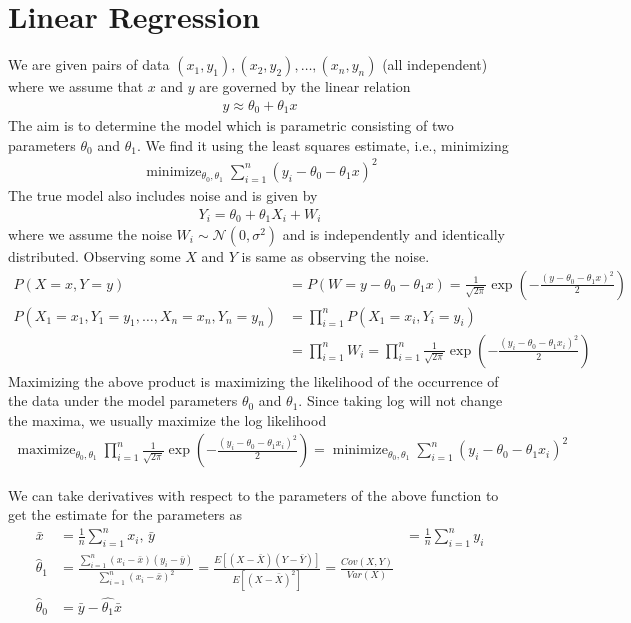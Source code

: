 \documentclass[11pt, a4paper]{article}
\DeclareMathOperator*{\minimize}{minimize}
\DeclareMathOperator*{\maximize}{maximize}
\begin{document}
    \section{Linear Regression}
    We are given pairs of data $(x_{1},y_{1}), (x_{2},y_{2}), \ldots, (x_{n},y_{n})$ (all independent) where we assume that $x$ and $y$ are governed by the linear relation
    \begin{align*}
        y \approx \theta_{0} + \theta_{1}x
    \end{align*}
    The aim is to determine the model which is parametric consisting of two parameters $\theta_{0}$ and $\theta_{1}$. We find it using the least squares estimate, i.e., minimizing
    \begin{align*}
        \minimize_{\theta_{0}, \theta_{1}} \sum_{i=1}^{n} (y_{i} - \theta_{0} - \theta_{1}x)^{2}
    \end{align*}
    The true model also includes noise and is given by
    \begin{align*}
        Y_{i} = \theta_{0} + \theta_{1}X_{i} + W_{i}
    \end{align*}
    where we assume the noise $W_{i} \sim \mathcal{N}(0, \sigma^{2})$ and is independently and identically distributed. Observing some $X$ and $Y$ is same as observing the noise.
    \begin{align*}
        P(X=x,Y=y) &= P(W=y-\theta_{0}-\theta_{1}x) = \frac{1}{\sqrt{2\pi}} \exp(-\frac{(y-\theta_{0}-\theta_{1}x)^{2}}{2})\\
        P(X_{1}=x_{1},Y_{1}=y_{1}, \ldots, X_{n}=x_{n},Y_{n}=y_{n}) &= \prod_{i=1}^{n} P(X_{1}=x_{i},Y_{i}=y_{i})\\
        &= \prod_{i=1}^{n} W_{i} = \prod_{i=1}^{n} \frac{1}{\sqrt{2\pi}} \exp(-\frac{(y_{i}-\theta_{0}-\theta_{1}x_{i})^{2}}{2})
    \end{align*}
    Maximizing the above product is maximizing the likelihood of the occurrence of the data under the model parameters $\theta_{0}$ and $\theta_{1}$. Since taking log will not change the maxima, we usually maximize the log likelihood
    \begin{align*}
        \maximize_{\theta_{0}, \theta_{1}} \prod_{i=1}^{n} \frac{1}{\sqrt{2\pi}} \exp(-\frac{(y_{i}-\theta_{0}-\theta_{1}x_{i})^{2}}{2}) = \minimize_{\theta_{0}, \theta_{1}} \sum_{i=1}^{n} (y_{i}-\theta_{0}-\theta_{1}x_{i})^{2}
    \end{align*}

    We can take derivatives with respect to the parameters of the above function to get the estimate for the parameters as
    \begin{align*}
        \bar{x} &= \frac{1}{n} \sum_{i=1}^{n} x_{i} \text{, } \bar{y} &= \frac{1}{n} \sum_{i=1}^{n} y_{i}\\
        \hat{\theta}_{1} &= \frac{\sum_{i=1}^{n} (x_{i} - \bar{x}) (y_{i} - \bar{y})}{\sum_{i=1}^{n}(x_{i} - \bar{x})^{2}} = \frac{E[(X-\bar{X})(Y-\bar{Y})]}{E[(X-\bar{X})^{2}]} = \frac{Cov(X,Y)}{Var(X)}\\
        \hat{\theta}_{0} &= \bar{y} - \hat{\theta_{1}} \bar{x}
    \end{align*}
\end{document}
